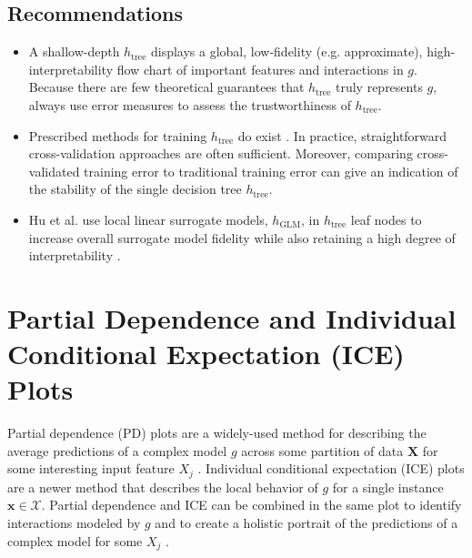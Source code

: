 \documentclass[11pt]{asaproc}
\begin{document}
\subsection{Recommendations}

\begin{itemize}
	
	\item A shallow-depth $h_{\text{tree}}$ displays a global, low-fidelity (e.g. approximate), high-interpretability flow chart of important features and interactions in $g$. Because there are few theoretical guarantees that $h_{\text{tree}}$ truly represents $g$, always use error measures to assess the trustworthiness of $h_{\text{tree}}$.
	
	\item Prescribed methods for training $h_{\text{tree}}$ do exist \cite{dt_surrogate1} \cite{dt_surrogate2}. In practice, straightforward cross-validation approaches are often sufficient. Moreover, comparing cross-validated training error to traditional training error can give an indication of the stability of the single decision tree $h_{\text{tree}}$.
	
	\item Hu et al. use local linear surrogate models, $h_{\text{GLM}}$, in $h_{\text{tree}}$ leaf nodes to increase overall surrogate model fidelity while also retaining a high degree of interpretability \cite{lime-sup}.
	
\end{itemize}

\section{Partial Dependence and Individual Conditional Expectation (ICE) Plots}
\label{sec:pd_ice}

Partial dependence (PD) plots are a widely-used method for describing the average predictions of a complex model $g$ across some partition of data $\mathbf{X}$ for some interesting input feature $X_j$ \cite{esl}. Individual conditional expectation (ICE) plots are a newer method that describes the local behavior of $g$ for a single instance $\mathbf{x} \in \mathcal{X}$. Partial dependence and ICE can be combined in the same plot to identify interactions modeled by $g$ and to create a holistic portrait of the predictions of a complex model for some $X_j$  \cite{ice_plots}.
\end{document}
